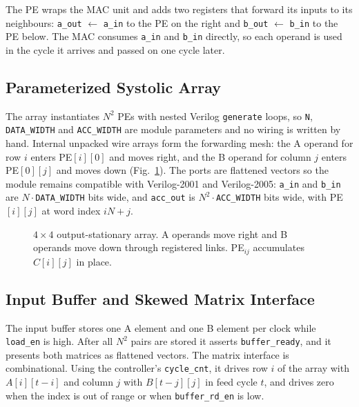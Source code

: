 \documentclass[conference]{IEEEtran}
\begin{document}
The PE wraps the MAC unit and adds two registers that forward its inputs to its neighbours:
\texttt{a\_out} $\leftarrow$ \texttt{a\_in} to the PE on the right and \texttt{b\_out}
$\leftarrow$ \texttt{b\_in} to the PE below. The MAC consumes \texttt{a\_in} and \texttt{b\_in}
directly, so each operand is used in the cycle it arrives and passed on one cycle later.

\subsection{Parameterized Systolic Array}
The array instantiates $N^2$ PEs with nested Verilog \texttt{generate} loops, so
\texttt{N}, \texttt{DATA\_WIDTH} and \texttt{ACC\_WIDTH} are module parameters and no wiring
is written by hand. Internal unpacked wire arrays form the forwarding mesh: the A operand for
row $i$ enters PE$[i][0]$ and moves right, and the B operand for column $j$ enters PE$[0][j]$
and moves down (Fig.~\ref{fig:array}). The ports are flattened vectors so the module remains
compatible with Verilog-2001 and Verilog-2005: \texttt{a\_in} and \texttt{b\_in} are
$N\cdot$\texttt{DATA\_WIDTH} bits wide, and \texttt{acc\_out} is
$N^2\cdot$\texttt{ACC\_WIDTH} bits wide, with PE$[i][j]$ at word index $iN+j$.

\begin{figure}[t]
\centering
{}
\caption{$4\times4$ output-stationary array. A operands move right and B operands move down
through registered links. PE$_{ij}$ accumulates $C[i][j]$ in place.}
\label{fig:array}
\end{figure}

\subsection{Input Buffer and Skewed Matrix Interface}
The input buffer stores one A element and one B element per clock while \texttt{load\_en} is
high. After all $N^2$ pairs are stored it asserts \texttt{buffer\_ready}, and it presents
both matrices as flattened vectors. The matrix interface is combinational. Using the
controller's \texttt{cycle\_cnt}, it drives row $i$ of the array with $A[i][t-i]$ and column $j$
with $B[t-j][j]$ in feed cycle $t$, and drives zero when the index is out of range or when
\texttt{buffer\_rd\_en} is low.
\end{document}
